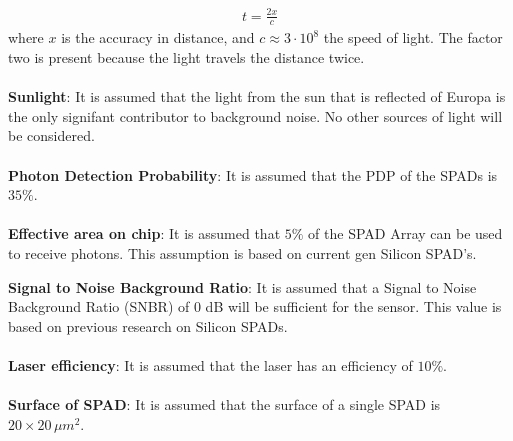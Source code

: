 \begin{align}\label{eq:accuracy}
t = \frac{2x}{c}
\end{align}
where $x$ is the accuracy in distance, and $c\approx 3\cdot10^8$ the speed of light. The factor two is present because the light travels the distance twice.\\
\\
\textbf{Sunlight}: It is assumed that the light from the sun that is reflected of Europa is the only signifant contributor to background noise. No other sources of light will be considered. \\
\\
\textbf{Photon Detection Probability}: It is assumed that the PDP of the SPADs is $35\%$.\\
\\
\textbf{Effective area on chip}: It is assumed that $5\%$ of the SPAD Array can be used to receive photons. This assumption is based on current gen Silicon SPAD's.\\

\textbf{Signal to Noise Background Ratio}: It is assumed that a Signal to Noise Background Ratio (SNBR) of 0 dB will be sufficient for the sensor. This value is based on previous research on Silicon SPADs.\\
\\
\textbf{Laser efficiency}: It is assumed that the laser has an efficiency of $10\%$.\\
\\
\textbf{Surface of SPAD}: It is assumed that the surface of a single SPAD is $20\times 20 \,\mu m^2$.